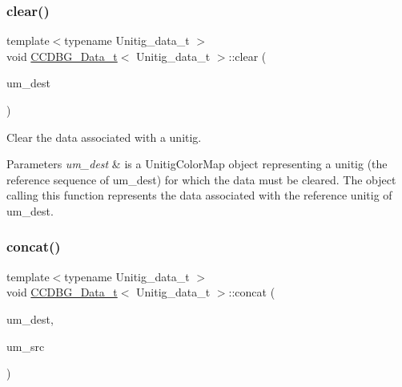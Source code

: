 \subsubsection{\texorpdfstring{clear()}{clear()}}
{\footnotesize\ttfamily template$<$typename Unitig\+\_\+data\+\_\+t $>$ \\
void \hyperlink{classCCDBG__Data__t}{C\+C\+D\+B\+G\+\_\+\+Data\+\_\+t}$<$ Unitig\+\_\+data\+\_\+t $>$\+::clear (\begin{DoxyParamCaption}\item[{const \hyperlink{classUnitigMap}{Unitig\+Color\+Map}$<$ U $>$ \&}]{um\+\_\+dest }\end{DoxyParamCaption})\hspace{0.3cm}{\ttfamily [inline]}}



Clear the data associated with a unitig. 


\begin{DoxyParams}{Parameters}
{\em um\+\_\+dest} & is a Unitig\+Color\+Map object representing a unitig (the reference sequence of um\+\_\+dest) for which the data must be cleared. The object calling this function represents the data associated with the reference unitig of um\+\_\+dest. \\
\hline
\end{DoxyParams}
\mbox{\label{classCCDBG__Data__t_a0ce6821deb4441f8a7dd3d270ed8b3a6}} 
\subsubsection{\texorpdfstring{concat()}{concat()}}
{\footnotesize\ttfamily template$<$typename Unitig\+\_\+data\+\_\+t $>$ \\
void \hyperlink{classCCDBG__Data__t}{C\+C\+D\+B\+G\+\_\+\+Data\+\_\+t}$<$ Unitig\+\_\+data\+\_\+t $>$\+::concat (\begin{DoxyParamCaption}\item[{const \hyperlink{classUnitigMap}{Unitig\+Color\+Map}$<$ U $>$ \&}]{um\+\_\+dest,  }\item[{const \hyperlink{classUnitigMap}{Unitig\+Color\+Map}$<$ U $>$ \&}]{um\+\_\+src }\end{DoxyParamCaption})\hspace{0.3cm}{\ttfamily [inline]}}



